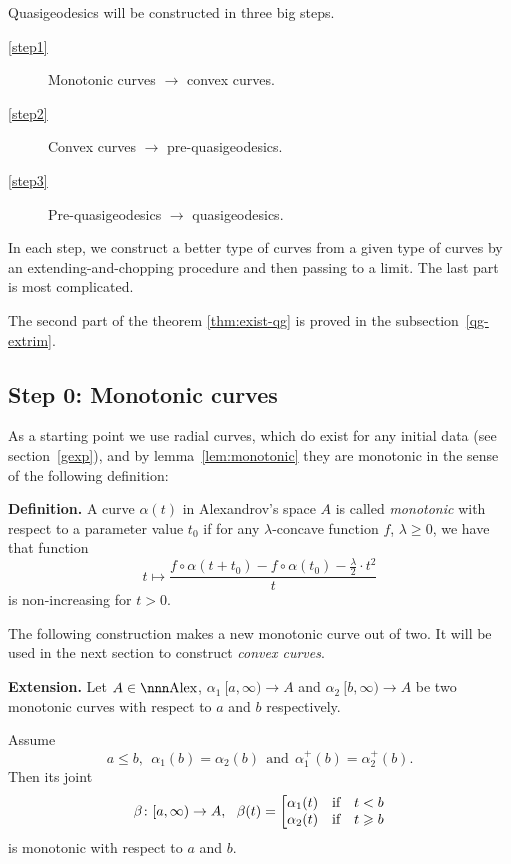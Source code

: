 \documentclass{article}
\begin{document}
Quasigeodesics will be constructed in three big steps. 
\begin{description}
\item [\ref{step1}] Monotonic curves $\longrightarrow$ convex curves.
\item [\ref{step2}] Convex curves $\longrightarrow$ pre-quasigeodesics.
\item [\ref{step3}] Pre-quasigeodesics $\longrightarrow$ quasigeodesics.
\end{description}

In each step, we construct a better type of curves from a given type of curves
by an extending-and-chopping procedure and then passing to a limit.
The last part is most complicated.

The second part of the theorem \ref{thm:exist-qg} 
is
proved in the subsection~\ref{qg-extrim}.








\setcounter{subsection}{-1}
\subsection{Step 0: Monotonic curves} 

As a starting point we use radial curves, which do exist for any initial data
(see section~\ref{gexp}), and by lemma~\ref{lem:monotonic} 
they are monotonic in the
sense of the following definition:

\begin{thm}{\bf Definition.}
A curve $\alpha(t)$ in Alexandrov's space $A$ is called \emph{monotonic} with
respect to a parameter value $t_0$ if for any $\lambda$-concave function $f$,
$\lambda\ge 0$, we have that function
$$t
\mapsto
\frac{f\circ\alpha(t+t_0)-f\circ\alpha(t_0)-\tfrac\lambda2{\cdot}t^2}t$$ 
is non-increasing for $t>0$. 
\end{thm}

The following construction makes a new monotonic curve out of two. 
It will be used in the next section to construct \emph{convex curves}.

\begin{thm}{\bf Extension.}\label{ext-mono}
Let $A\in\Alex$, $\alpha_1\:[a,\infty)\to A$ and $\alpha_2\:[b,\infty)\to A$ be two
monotonic curves with respect to $a$ and $b$ respectively. 

Assume 
$$a\le b,
\ \ \alpha_1(b)=\alpha_2(b)
\ \ \text{and}\ \
\alpha^+_1(b)=\alpha^+_2(b).$$ 
Then its joint
$$\beta\:[a,\infty)\to A,
\ \ 
\beta(t)=\l[
\begin{matrix}
\alpha_1(t)&\text{if}&t< b\\
\alpha_2(t)&\text{if}&t\ge b
\end{matrix}\right.
$$
is monotonic with respect to $a$ and $b$.
\end{thm}
\end{document}
